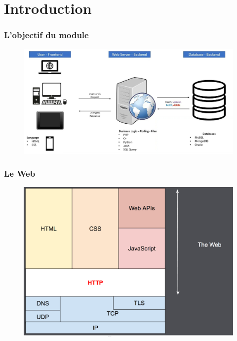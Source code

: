 

\section{Introduction}
\label{sec:introduction}

\begin{frame}
    \frametitle{L'objectif du module}

    \begin{figure}
        \centering
        \includegraphics[width=\linewidth]{figures/introduction/overview}
        \label{fig:overview}
    \end{figure}
\end{frame}

\begin{frame}
    \frametitle{Le Web}

    \begin{figure}
        \centering
        \includegraphics[height=0.5\linewidth]{figures/introduction/http-layers}
        \label{fig:web}
    \end{figure}
\end{frame}


